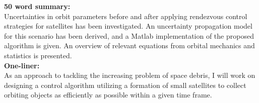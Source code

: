 \textbf{50 word summary:} \\
Uncertainties in orbit parameters before and after applying rendezvous control strategies for satellites has been investigated. An uncertainty propagation model for this scenario has been derived, and a Matlab implementation of the proposed algorithm is given. An overview of relevant equations from orbital mechanics and statistics is presented. \\

\textbf{One-liner:} \\
As an approach to tackling the increasing problem of space debris, I will work on designing a control algorithm utilizing a formation of small satellites to collect orbiting objects as efficiently as possible within a given time frame.
